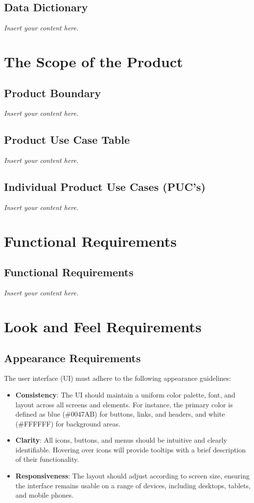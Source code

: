 \documentclass[12pt]{article}
\newcommand{\lips}{\textit{Insert your content here.}}
\begin{document}
\subsection{Data Dictionary}
\lips

\section{The Scope of the Product}
\subsection{Product Boundary}
\lips
\subsection{Product Use Case Table}
\lips
\subsection{Individual Product Use Cases (PUC's)}
\lips

\section{Functional Requirements}
\subsection{Functional Requirements}
\lips

\section{Look and Feel Requirements}

\subsection{Appearance Requirements}
The user interface (UI) must adhere to the following appearance guidelines:
\begin{itemize}
    \item \textbf{Consistency}: The UI should maintain a uniform color palette, 
    font, and layout across all screens and elements. For instance, the primary 
    color is defined as blue (\#0047AB) for buttons, links, and headers, and 
    white (\#FFFFFF) for background areas.
    
    \item \textbf{Clarity}: All icons, buttons, and menus should be intuitive and 
    clearly identifiable. Hovering over icons will provide tooltips with a brief 
    description of their functionality.
    
    \item \textbf{Responsiveness}: The layout should adjust according to screen 
    size, ensuring the interface remains usable on a range of devices, including 
    desktops, tablets, and mobile phones.
\end{itemize}
\end{document}
